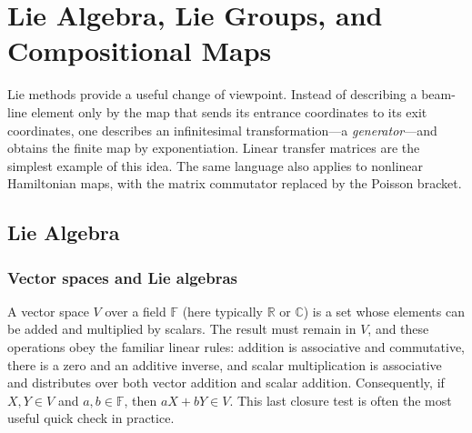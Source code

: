 \chapter{Lie Algebra, Lie Groups, and Compositional Maps}

Lie methods provide a useful change of viewpoint.  Instead of describing a
beam-line element only by the map that sends its entrance coordinates to its
exit coordinates, one describes an infinitesimal transformation---a
\emph{generator}---and obtains the finite map by exponentiation.  Linear
transfer matrices are the simplest example of this idea.  The same language
also applies to nonlinear Hamiltonian maps, with the matrix commutator
replaced by the Poisson bracket.



\section{Lie Algebra}

\subsection{Vector spaces and Lie algebras}

A vector space $V$ over a field $\mathbb{F}$ (here typically
$\mathbb{R}$ or $\mathbb{C}$) is a set whose elements can be added and
multiplied by scalars.  The result must remain in $V$, and these operations
obey the familiar linear rules: addition is associative and commutative,
there is a zero and an additive inverse, and scalar multiplication is
associative and distributes over both vector addition and scalar addition.
Consequently, if $X,Y\in V$ and $a,b\in\mathbb{F}$, then
$aX + bY\in V$.  This last closure test is often the most useful quick check in
practice.

